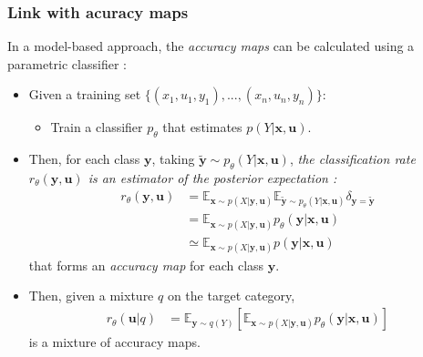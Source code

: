 

\subsubsection{Link with acuracy maps}
In a model-based approach, the \emph{accuracy maps} can be calculated using a parametric classifier : 
\begin{itemize}
	\item Given a training set $\{(x_1, u_1, y_1), ..., (x_n, u_n, y_n)\}$:
	\begin{itemize}
		\item Train a classifier $p_\theta$ that estimates $p(Y|\boldsymbol{x}, \boldsymbol{u})$. 
	\end{itemize}
	\item Then, for each class $\boldsymbol{y}$, taking $\tilde{\boldsymbol{y}}\sim p_\theta(Y|\boldsymbol{x}, \boldsymbol{u})$,\emph{ the classification rate $r_\theta(\boldsymbol{y}, \boldsymbol{u})$ is an estimator of the posterior expectation :}
\begin{align*}
r_\theta(\boldsymbol{y}, \boldsymbol{u}) 
&= \mathbb{E}_{ \boldsymbol{x} \sim p(X|\boldsymbol{y}, \boldsymbol{u})}
\mathbb{E}_{\tilde{\boldsymbol{y}}\sim p_\theta(Y|\boldsymbol{x}, \boldsymbol{u})} \delta_{\boldsymbol{y}=\tilde{\boldsymbol{y}}}\\
&= \mathbb{E}_{ \boldsymbol{x} \sim p(X|\boldsymbol{y}, \boldsymbol{u})} p_\theta(\boldsymbol{y}|\boldsymbol{x}, \boldsymbol{u})\\
&\simeq \mathbb{E}_{ \boldsymbol{x} \sim p(X|\boldsymbol{y}, \boldsymbol{u})} p(\boldsymbol{y}|\boldsymbol{x}, \boldsymbol{u})
\end{align*} 
that forms an \emph{accuracy map} for each class $\boldsymbol{y}$.\\
\item Then, given a mixture $q$ on the target category, 
\begin{align*}
 r_\theta(\boldsymbol{u}|q) &= \mathbb{E}_{\boldsymbol{y}\sim q(Y)} \left[\mathbb{E}_{ \boldsymbol{x} \sim p(X|\boldsymbol{y}, \boldsymbol{u})}  p_\theta(\boldsymbol{y}|\boldsymbol{x}, \boldsymbol{u}) \right]
\end{align*} is a mixture of accuracy maps.
\end{itemize}

